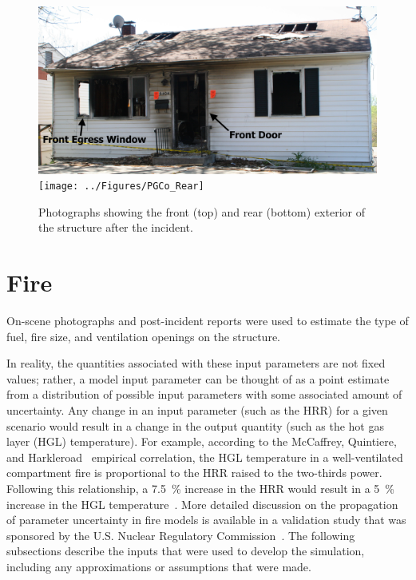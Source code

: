\documentclass[12pt,oneside]{book}
\begin{document}
\begin{figure}[!ht]
\includegraphics[width=5in]{../Figures/PGCo_Front} \\ 
\vspace{0.1in}
\texttt{[image: ../Figures/PGCo\_Rear]}
\caption{Photographs showing the front (top) and rear (bottom) exterior of the structure after the incident.}
\label{fig:exterior}
\end{figure}


\section{Fire}
\label{fire}

On-scene photographs and post-incident reports were used to estimate the type of fuel, fire size, and ventilation openings on the structure.

In reality, the quantities associated with these input parameters are not fixed values; rather, a model input parameter can be thought of as a point estimate from a distribution of possible input parameters with some associated amount of uncertainty. Any change in an input parameter (such as the HRR) for a given scenario would result in a change in the output quantity (such as the hot gas layer (HGL) temperature). For example, according to the McCaffrey, Quintiere, and Harkleroad~\cite{SFPE:Walton} empirical correlation, the HGL temperature in a well-ventilated compartment fire is proportional to the HRR raised to the two-thirds power. Following this relationship, a 7.5~\% increase in the HRR would result in a 5~\% increase in the HGL temperature~\cite{NUREG_1824_Sup_1}. More detailed discussion on the propagation of parameter uncertainty in fire models is available in a validation study that was sponsored by the U.S. Nuclear Regulatory Commission~\cite{NUREG_1824_Sup_1}. The following subsections describe the inputs that were used to develop the simulation, including any approximations or assumptions that were made.
\end{document}
